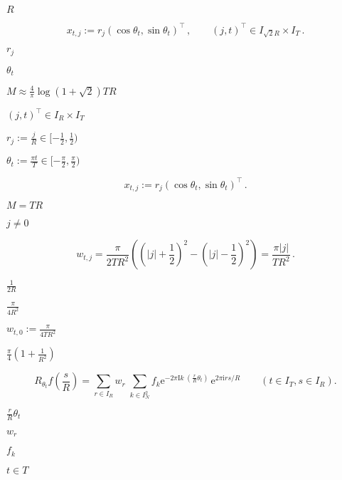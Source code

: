 \documentclass{article}
\begin{document}
$R$
\pagebreak

\[ x_{t,j} := r_j\left(\cos\theta_t, \sin\theta_t\right)^{\top}\,,\qquad (j,t)^{\top}\in I_{\sqrt{2}R}\times I_T\,. \]
\pagebreak

$r_j$
\pagebreak

$\theta_t$
\pagebreak

$M \approx \frac{4}{\pi}\log(1+\sqrt{2}) T R$
\pagebreak

$(j,t)^{\top}\in I_R\times I_T$
\pagebreak

$r_j := \frac{j}{R} \in [-\frac{1}{2},\frac{1}{2})$
\pagebreak

$\theta_t := \frac{\pi t}{T} \in [-\frac{\pi}{2},\frac{\pi}{2})$
\pagebreak

\[ x_{t,j} := r_j\left(\cos\theta_t, \sin\theta_t\right)^{\top}\,. \]
\pagebreak

$M=TR$
\pagebreak

$j \ne 0$
\pagebreak

\[ w_{t,j} = \frac{\pi}{2TR^2}\left(\left(|j|+\frac{1}{2}\right)^2- \left(|j|-\frac{1}{2}\right)^2\right) = \frac{\pi |j| }{TR^2}\, . \]
\pagebreak

$\frac{1}{2R}$
\pagebreak

$\frac{\pi}{4R^2}$
\pagebreak

$w_{t,0} := \frac{\pi}{4TR^2}$
\pagebreak

$\frac{\pi}{4}(1+\frac{1}{R^2})$
\pagebreak

\[ R_{\theta_t} f\left(\frac{s}{R}\right) = \sum_{r \in I_R} w_r \; \sum_{k \in I_N^2} f_{k} \mathrm{e}^{-2\pi\mathrm{I} k \; (\frac{r}{R}\theta_t)} \, \mathrm{e}^{2\pi\mathrm{i} r s / R} \qquad(t \in I_T, s \in I_R). \]
\pagebreak

$\frac{r}{R}\theta_t$
\pagebreak

$w_r$
\pagebreak

$f_k$
\pagebreak

$t \in T$
\pagebreak
\end{document}
